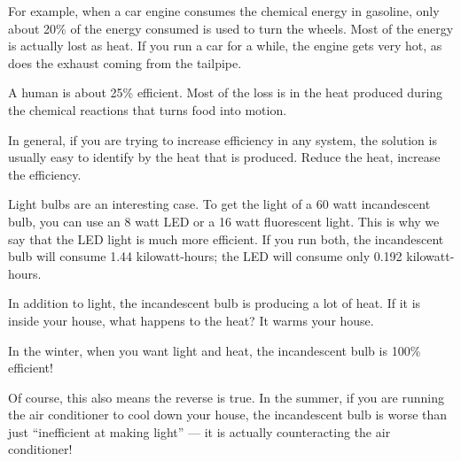 For example, when a car engine consumes the chemical energy in gasoline, only
about 20\% of the energy consumed is used to turn the wheels. Most of
the energy is actually lost as heat. If you run a car for a while, the engine
gets very hot, as does the exhaust coming from the tailpipe.

A human is about 25\% efficient. Most of the loss is in the heat produced
during the chemical reactions that turns food into motion.

In general, if you are trying to increase efficiency in any system,
the solution is usually easy to identify by the heat that is produced. Reduce the heat, increase the efficiency.

Light bulbs are an interesting case. To get the light of a 60 watt
incandescent bulb, you can use an 8 watt LED or a 16 watt fluorescent
light. This is why we say that the LED light is much more efficient. If you
run both, the incandescent bulb will consume 1.44 kilowatt-hours; the
LED will consume only 0.192 kilowatt-hours.

In addition to light, the incandescent bulb is producing a lot of heat. If it
is inside your house, what happens to the heat? It warms your house.

In the winter, when you want light and heat, the incandescent bulb is
100\% efficient!

Of course, this also means the reverse is true. In the summer, if you are running the air conditioner to cool down your house, the
incandescent bulb is worse than just ``inefficient at making light'' ---
it is actually counteracting the air conditioner!
